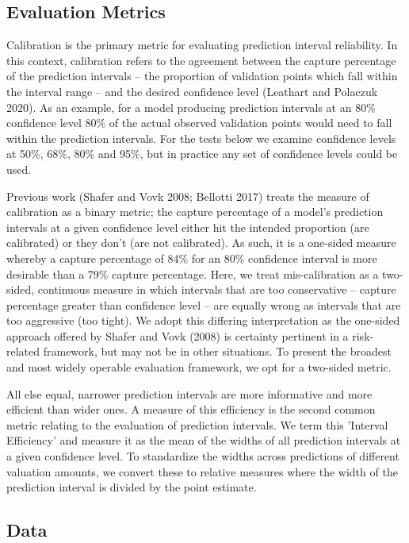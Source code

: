 \documentclass[colTwo]{anon}
\theoremstyle{definition}
\begin{document}
\subsection{Evaluation Metrics}

Calibration is the primary metric for evaluating prediction interval reliability.  In this context, calibration refers to the agreement between the capture percentage of the prediction intervals -- the proportion of validation points which fall within the interval range -- and the desired confidence level (Leathart and Polaczuk 2020).  As an example, for a model producing prediction intervals at an 80\% confidence level 80\% of the actual observed validation points would need to fall within the prediction intervals.  For the tests below we examine confidence levels at 50\%, 68\%, 80\% and 95\%, but in practice any set of confidence levels could be used.

Previous work (Shafer and Vovk 2008; Bellotti 2017) treats the measure of calibration as a binary metric; the capture percentage of a model’s prediction intervals at a given confidence level either hit the intended proportion (are calibrated) or they don’t (are not calibrated).  As such, it is a one-sided measure whereby a capture percentage of 84\% for an 80\% confidence interval is more desirable than a 79\% capture percentage.  Here, we treat mis-calibration as a two-sided, continuous measure in which intervals that are too conservative -- capture percentage greater than confidence level -- are equally wrong as intervals that are too aggressive (too tight). We adopt this differing interpretation as the one-sided approach offered by Shafer and Vovk (2008) is certainty pertinent in a risk-related framework, but may not be in other situations. To present the broadest and most widely operable evaluation framework, we opt for a two-sided metric.

All else equal, narrower prediction intervals are more informative and more efficient than wider ones.  A measure of this efficiency is the second common metric relating to the evaluation of prediction intervals. We term this 'Interval Efficiency' and measure it as the mean of the widths of all prediction intervals at a given confidence level. To standardize the widths across predictions of different valuation amounts, we convert these to relative measures where the width of the prediction interval is divided by the point estimate.

\subsection{Data}
\end{document}
